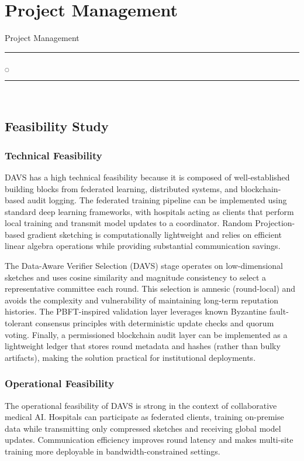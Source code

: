 \chapter[Project Management]{Project Management}{Project Management}\label{projm}


\rule{0.49\textwidth}{0.75pt} $_{\bigcirc}$ \rule{0.49\textwidth}{0.75pt}\\





\section{Feasibility Study}

\subsection{Technical Feasibility}
DAVS has a high technical feasibility because it is composed of well-established building blocks from federated learning, distributed systems, and blockchain-based audit logging. The federated training pipeline can be implemented using standard deep learning frameworks, with hospitals acting as clients that perform local training and transmit model updates to a coordinator. Random Projection-based gradient sketching is computationally lightweight and relies on efficient linear algebra operations while providing substantial communication savings.

The Data-Aware Verifier Selection (DAVS) stage operates on low-dimensional sketches and uses cosine similarity and magnitude consistency to select a representative committee each round. This selection is amnesic (round-local) and avoids the complexity and vulnerability of maintaining long-term reputation histories. The PBFT-inspired validation layer leverages known Byzantine fault-tolerant consensus principles with deterministic update checks and quorum voting. Finally, a permissioned blockchain audit layer can be implemented as a lightweight ledger that stores round metadata and hashes (rather than bulky artifacts), making the solution practical for institutional deployments.
\subsection{Operational Feasibility}

The operational feasibility of DAVS is strong in the context of collaborative medical AI. Hospitals can participate as federated clients, training on-premise data while transmitting only compressed sketches and receiving global model updates. Communication efficiency improves round latency and makes multi-site training more deployable in bandwidth-constrained settings.

